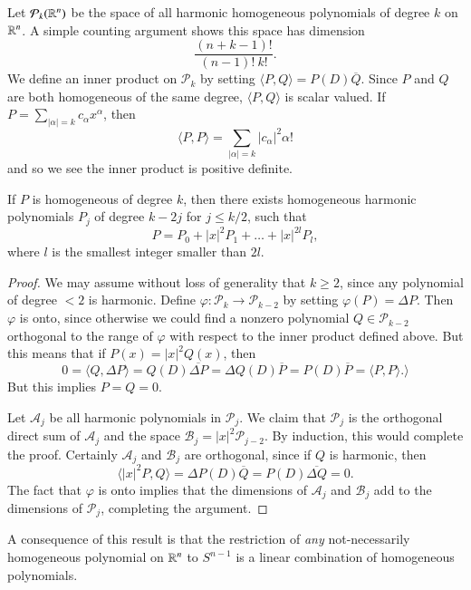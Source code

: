 Let $\mathcal{P}_k(\operatorname{\mathbb{R}}^n)$ be the space of all harmonic homogeneous polynomials of degree $k$ on $\operatorname{\mathbb{R}}^n$. A simple counting argument shows this space has dimension
%
\[ \frac{(n + k - 1)!}{(n-1)!\ k!}. \]
%
We define an inner product on $\mathcal{P}_k$ by setting $\langle P, Q \rangle = P(D) \overline{Q}$. Since $P$ and $Q$ are both homogeneous of the same degree, $\langle P, Q \rangle$ is scalar valued. If $P = \sum_{|\alpha| = k} c_\alpha x^\alpha$, then
%
\[ \langle P, P \rangle = \sum_{|\alpha| = k} |c_\alpha|^2 \alpha! \]
%
and so we see the inner product is positive definite.

\begin{theorem}
    If $P$ is homogeneous of degree $k$, then there exists homogeneous harmonic polynomials $P_j$ of degree $k - 2j$ for $j \leq k/2$, such that
    \[ P = P_0 + |x|^2 P_1 + \dots + |x|^{2l} P_l, \]
    where $l$ is the smallest integer smaller than $2l$.
\end{theorem}
\begin{proof}
    We may assume without loss of generality that $k \geq 2$, since any polynomial of degree $< 2$ is harmonic. Define $\varphi: \mathcal{P}_k \to \mathcal{P}_{k-2}$ by setting $\varphi(P) = \Delta P$. Then $\varphi$ is onto, since otherwise we could find a nonzero polynomial $Q \in \mathcal{P}_{k-2}$ orthogonal to the range of $\varphi$ with respect to the inner product defined above. But this means that if $P(x) = |x|^2 Q(x)$, then
    \[ 0 = \langle Q, \Delta P \rangle = Q(D) \overline{\Delta P} = \Delta Q(D) \overline{P} = P(D) \overline{P} = \langle P, P \rangle. \rangle \]
    But this implies $P = Q = 0$.

    Let $\mathcal{A}_j$ be all harmonic polynomials in $\mathcal{P}_j$. We claim that $\mathcal{P}_j$ is the orthogonal direct sum of $\mathcal{A}_j$ and the space $\mathcal{B}_j = |x|^2 \mathcal{P}_{j-2}$. By induction, this would complete the proof. Certainly $\mathcal{A}_j$ and $\mathcal{B}_j$ are orthogonal, since if $Q$ is harmonic, then
    \[ \langle |x|^2 P, Q \rangle = \Delta P(D) \overline{Q} = P(D) \overline{\Delta Q} = 0. \]
    The fact that $\varphi$ is onto implies that the dimensions of $\mathcal{A}_j$ and $\mathcal{B}_j$ add to the dimensions of $\mathcal{P}_j$, completing the argument.
\end{proof}

\begin{remark}
    A consequence of this result is that the restriction of \emph{any} not-necessarily homogeneous polynomial on $\operatorname{\mathbb{R}}^n$ to $S^{n-1}$ is a linear combination of homogeneous polynomials.
\end{remark}

